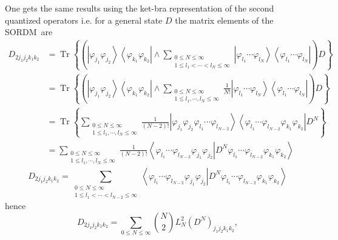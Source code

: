 \documentclass[aps,preprint]{revtex4}%
\begin{document}
One gets the same results using the ket-bra representation of the second
quantized operators i.e. for a general state $D$ the matrix elements of the
SORDM\ are
\begin{align}
D_{2j_{1}j_{2}k_{1}k_{2}}  &  =\operatorname{Tr}\left\{  \left(  \left\vert
\varphi_{j_{1}}\varphi_{j_{2}}\right\rangle \left\langle \varphi_{k_{1}%
}\varphi_{k_{2}}\right\vert \wedge\sum_{\substack{0\leq N\leq\infty\\1\leq
l_{1}<\cdots<l_{N}\leq\infty}}\left\vert \varphi_{l_{1}}\cdots\varphi_{l_{N}%
}\right\rangle \left\langle \varphi_{l_{1}}\cdots\varphi_{l_{N}}\right\vert
\right)  D\right\} \nonumber\\
&  =\operatorname{Tr}\left\{  \left(  \left\vert \varphi_{j_{1}}\varphi
_{j_{2}}\right\rangle \left\langle \varphi_{k_{1}}\varphi_{k_{2}}\right\vert
\wedge\sum_{\substack{0\leq N\leq\infty\\1\leq l_{1},\cdots,l_{N}\leq\infty
}}\frac{1}{N!}\left\vert \varphi_{l_{1}}\cdots\varphi_{l_{N}}\right\rangle
\left\langle \varphi_{l_{1}}\cdots\varphi_{l_{N}}\right\vert \right)
D\right\} \nonumber\\
&  =\operatorname{Tr}\left\{  \sum_{\substack{0\leq N\leq\infty\\1\leq
l_{1},\cdots,l_{N}\leq\infty}}\frac{1}{\left(  N-2\right)  !}\left\vert
\varphi_{j_{1}}\varphi_{j_{2}}\varphi_{l_{1}}\cdots\varphi_{l_{N-2}%
}\right\rangle \left\langle \varphi_{l_{1}}\cdots\varphi_{l_{N-2}}%
\varphi_{k_{1}}\varphi_{k_{2}}\right\vert D^{N}\right\} \nonumber\\
&  =\sum_{\substack{0\leq N\leq\infty\\1\leq l_{1},\cdots,l_{N}\leq\infty
}}\frac{1}{\left(  N-2\right)  !}\left\langle \left.  \varphi_{l_{1}}%
\cdots\varphi_{l_{N-2}}\varphi_{j_{1}}\varphi_{j_{2}}\right\vert D^{N}%
\varphi_{l_{1}}\cdots\varphi_{l_{N-2}}\varphi_{k_{1}}\varphi_{k_{2}%
}\right\rangle
\end{align}%
\begin{equation}
D_{2j_{1}j_{2}k_{1}k_{2}}=\sum_{\substack{0\leq N\leq\infty\\1\leq
l_{1}<\cdots<l_{N-2}\leq\infty}}\left\langle \left.  \varphi_{l_{1}}%
\cdots\varphi_{l_{N-2}}\varphi_{j_{1}}\varphi_{j_{2}}\right\vert D^{N}%
\varphi_{l_{1}}\cdots\varphi_{l_{N-2}}\varphi_{k_{1}}\varphi_{k_{2}%
}\right\rangle
\end{equation}
hence%
\begin{equation}
D_{2j_{1}j_{2}k_{1}k_{2}}=\sum_{0\leq N\leq\infty}\binom{N}{2}L_{N}^{2}\left(
D^{N}\right)  _{j_{1}j_{2}k_{1}k_{2}},
\end{equation}
\end{document}
